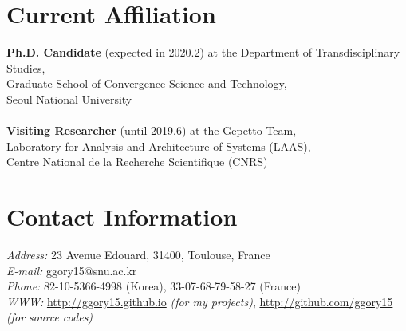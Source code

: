 \documentclass[margin,line]{res}
\begin{document}

\begin{resume}

\section{\sc Current Affiliation}

\textbf{Ph.D. Candidate} (expected in 2020.2) at the Department of Transdisciplinary Studies,\\
Graduate School of Convergence Science and Technology, \\
Seoul National University \\
\\
\textbf{Visiting Researcher} (until 2019.6) at the Gepetto Team,\\
Laboratory for Analysis and Architecture of Systems (LAAS), \\
Centre National de la Recherche Scientifique (CNRS) 


\section{\sc Contact Information}
{\it Address:} 23 Avenue Edouard, 31400, Toulouse, France \\
{\it E-mail:}  ggory15@snu.ac.kr\\       
{\it Phone:}  82-10-5366-4998 (Korea), 33-07-68-79-58-27 (France)\\            
{\it WWW:}  \url{http://ggory15.github.io} \textit{(for my projects)}, \url{http://github.com/ggory15} \textit{(for source codes)}





\end{resume}
\end{document}

